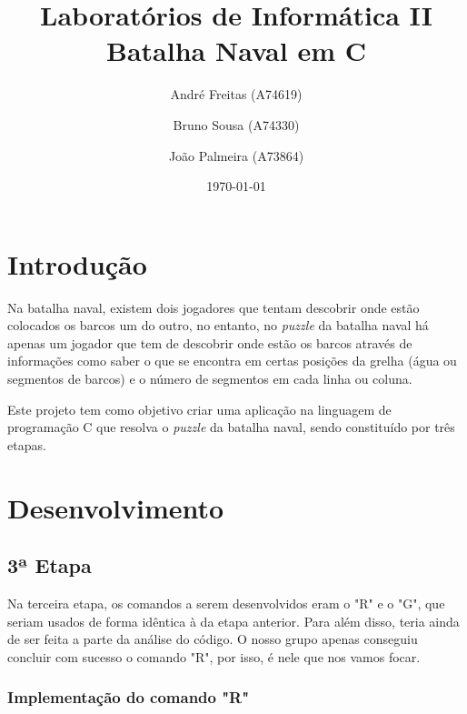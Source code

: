 \documentclass[12pt,a4paper,portuges]{article}
\begin{document}
\title{\textbf{Laboratórios de Informática II Batalha Naval em C}}
\author{André Freitas (A74619) \and Bruno Sousa (A74330) \and João Palmeira (A73864)}
\date{\today}
\maketitle

\newpage

\tableofcontents

\newpage

\section{\textbf{Introdução}}

Na batalha naval, existem dois jogadores que tentam descobrir onde estão colocados os barcos um do outro, no entanto, no \textit{puzzle} da batalha naval há apenas um jogador que tem de descobrir onde estão os barcos através de informações como saber o que se encontra em certas posições da grelha (água ou segmentos de barcos) e o número de segmentos em cada linha ou coluna. 

Este projeto tem como objetivo criar uma aplicação na linguagem de programação C que resolva o \textit{puzzle} da batalha naval, sendo constituído por três etapas.

\newpage

\section{\textbf{Desenvolvimento}}

\subsection{\textbf{3ª Etapa}}

Na terceira etapa, os comandos a serem desenvolvidos eram o "R" e o "G", que seriam usados de forma idêntica à da etapa anterior. Para além disso, teria ainda de ser feita a parte da análise do código. O nosso grupo apenas conseguiu concluir com sucesso o comando "R", por isso, é nele que nos vamos focar.

\subsubsection{\textbf{Implementação do comando "R"}}
\end{document}
